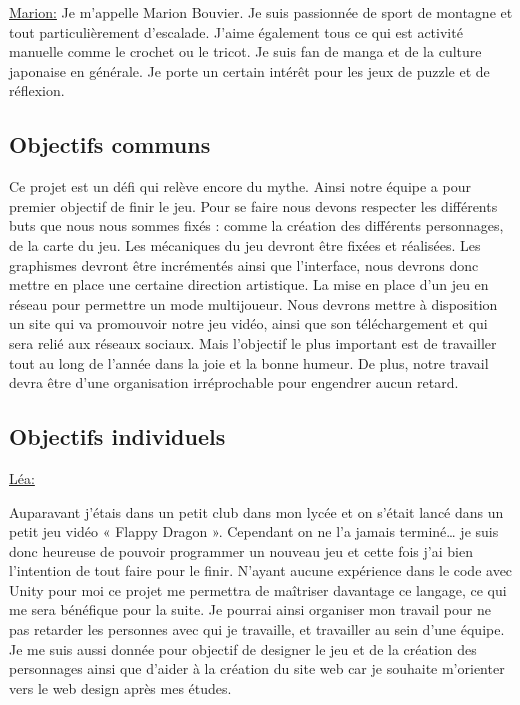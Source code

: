 \documentclass[12pt]{extarticle}
\begin{document}
\newpage
\underline{Marion:}
Je m'appelle Marion Bouvier. Je suis passionnée de sport de montagne et tout particulièrement d'escalade. J'aime également tous ce qui est activité manuelle comme le crochet ou le tricot. Je suis fan de manga et de la culture japonaise en générale. Je porte un certain intérêt pour les jeux de puzzle et de réflexion.

\subsection{Objectifs communs}

Ce projet est un défi qui relève encore du mythe. Ainsi notre équipe a pour premier objectif de finir le jeu. Pour se faire nous devons respecter les différents buts que nous nous sommes fixés :
comme la création des différents personnages, de la carte du jeu. Les mécaniques du jeu devront être fixées et réalisées. Les graphismes devront être incrémentés ainsi que l’interface, nous devrons donc mettre en place une certaine direction artistique. La mise en place d’un jeu en réseau pour permettre un mode multijoueur. Nous devrons mettre à disposition un site qui va promouvoir notre jeu vidéo, ainsi que son téléchargement et qui sera relié aux réseaux sociaux. Mais l’objectif le plus important est de travailler tout au long de l’année dans la joie et la bonne humeur. De plus, notre travail devra être d’une organisation irréprochable pour engendrer aucun retard.

\newpage

\subsection{Objectifs individuels}

\vspace{0.5cm}
\underline{Léa:}

Auparavant j’étais dans un petit club dans mon lycée et on s’était lancé dans un petit jeu vidéo « Flappy Dragon ». Cependant on ne l’a jamais terminé… je suis donc heureuse de pouvoir programmer un nouveau jeu et cette fois j’ai bien l’intention de tout faire pour le finir. N’ayant aucune expérience dans le code avec Unity pour moi ce projet me permettra de maîtriser davantage ce langage, ce qui me sera bénéfique pour la suite. Je pourrai ainsi organiser mon travail pour ne pas retarder les personnes avec qui je travaille, et travailler au sein d’une équipe. Je me suis aussi donnée pour objectif de designer le jeu et de la création des personnages ainsi que d'aider à la création du site web car je souhaite m'orienter vers le web design après mes études.
\end{document}
